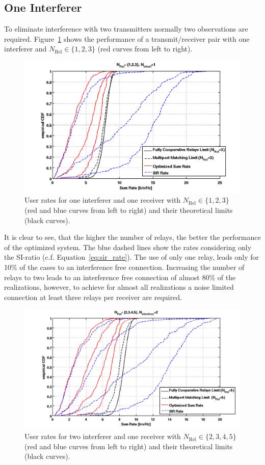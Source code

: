 \subsection{One Interferer}
\label{sec:1interf}
To eliminate interference with two transmitters normally two observations are required.
Figure~\ref{fig:relcomp_1} shows the performance of a transmit/receiver pair with one interferer and $N_\text{Rel}\in\{1,2,3\}$ (red curves from left to right).
\begin{figure}[h]
\centering
  \includegraphics[width=0.9\linewidth]{images/Relcomparison_1interferer.png}
\caption{User rates for one interferer and one receiver with  $N_\text{Rel}\in\{1,2,3\}$ (red and blue curves from left to right) and their theoretical limits (black curves).}
\label{fig:relcomp_1}
\end{figure}
It is clear to see, that the higher the number of relays, the better the performance of the optimized system.
The blue dashed lines show the rates considering only the SI-ratio (c.f. Equation~\eqref{eq:sir_rate}).
The use of only one relay, leads only for 10\% of the cases to an interference free connection.
Increasing the number of relays to two leads to an interference free connection of almost 80\% of the realizations, however, to achieve for almost all realizations a noise limited connection at least three relays per receiver are required.

\begin{figure}[h]
\centering
  \includegraphics[width=0.9\linewidth]{images/Relcomparison_2interferer.png}
\caption{User rates for two interferer and one receiver with  $N_\text{Rel}\in\{2,3,4,5\}$ (red and blue curves from left to right) and their theoretical limits (black curves).}
\label{fig:relcomp_2}
\end{figure}
